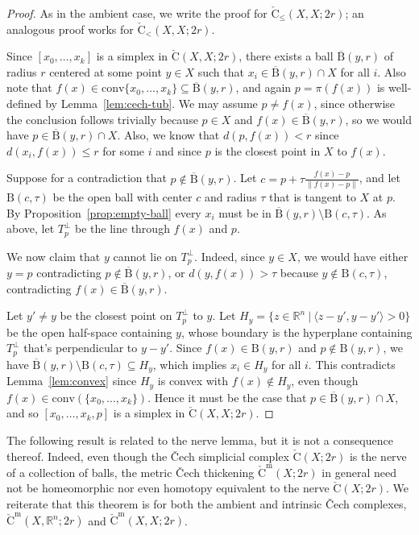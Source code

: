 \documentclass{amsart}
\theoremstyle{plain}
\theoremstyle{definition}
\theoremstyle{myremark}
\newcommand{\R}{\mathbb{R}}
\newcommand{\conv}{\mathrm{conv}}
\newcommand{\ball}[2]{\mathrm{B}(#1,#2)}
\newcommand{\cball}[2]{\overline{\mathrm{B}}(#1,#2)}
\newcommand{\cech}[2]{\mathrm{\check{C}}(#1;#2)}
\newcommand{\cecha}[3]{\mathrm{\check{C}}(#1,#2;#3)}
\newcommand{\cechaleq}[3]{\mathrm{\check{C}_{\le}}(#1,#2;#3)}
\newcommand{\cechaless}[3]{\mathrm{\check{C}_{<}}(#1,#2;#3)}
\newcommand{\cechm}[2]{\mathrm{\check{C}^m}(#1;#2)}
\newcommand{\cecham}[3]{\mathrm{\check{C}^m}(#1,#2;#3)}
\begin{document}
\begin{proof}
As in the ambient case, we write the proof for $\cechaleq{X}{X}{2r}$; an analogous proof works for $\cechaless{X}{X}{2r}$.

Since $[x_0 , \ldots , x_k]$ is a simplex in $\cecha{X}{X}{2r}$, there exists a ball $\cball{y}{r}$ of radius $r$ centered at some point $y\in X$ such that $x_i \in \cball{y}{r} \cap X$ for all $i$.
Also note that $f(x) \in \conv\{x_0,\ldots,x_k\}\subseteq \cball{y}{r}$, and again $p=\pi(f(x))$ is well-defined by Lemma~\ref{lem:cech-tub}.
We may assume $p\neq f(x)$, since otherwise the conclusion follows trivially because $p \in X$ and $f(x)\in \cball{y}{r}$, so we would have $p \in \cball{y}{r} \cap X$.
Also, we know that $d(p,f(x)) < r$ since $d(x_i,f(x)) \le r$ for some $i$ and since $p$ is the closest point in $X$ to $f(x)$.

Suppose for a contradiction that $p \notin \cball{y}{r}$.
Let $c=p+\tau\frac{f(x)-p}{\|f(x)-p\|}$, and let $\ball{c}{\tau}$ be the open ball with center $c$ and radius $\tau$ that is tangent to $X$ at $p$.
By Proposition~\ref{prop:empty-ball} every $x_i$ must be in $\cball{y}{r} \setminus \ball{c}{\tau}$.
As above, let $T_p^{\perp}$ be the line through $f(x)$ and $p$.

We now claim that $y$ cannot lie on $T_p^{\perp}$.
Indeed, since $y \in X$, we would have either $y = p$ contradicting $p \notin \cball{y}{r}$, or $d(y,f(x)) > \tau$ because $y \notin \ball{c}{\tau}$, contradicting $f(x) \in \cball{y}{r}$.

Let $y'\neq y$ be the closest point on $T_p^\perp$ to $y$.
Let $H_y=\{z\in\R^n~|~\langle z-y',y-y'\rangle>0\}$ be the open half-space containing $y$, whose boundary is the hyperplane containing $T_p^\perp$ that's perpendicular to $y-y'$.
Since $f(x)\in\ball{y}{r}$ and $p\notin\ball{y}{r}$, we have $\cball{y}{r} \setminus \ball{c}{\tau} \subseteq H_y$, which implies $x_i \in H_y$ for all $i$.
This contradicts Lemma~\ref{lem:convex} since $H_y$ is convex with $f(x)\notin H_y$, even though $f(x)\in\conv(\{x_0,\ldots,x_k\})$.
Hence it must be the case that $p \in \cball{y}{r} \cap {X}$, and so $[x_0 , \ldots , x_k , p ]$ is a simplex in $\cecha{X}{X}{2r}$.
\end{proof}

The following result is related to the nerve lemma, but it is not a consequence thereof. Indeed, even though the \v{C}ech simplicial complex $\cech{X}{2r}$ is the nerve of a collection of balls, the metric \v{C}ech thickening $\cechm{X}{2r}$ in general need not be homeomorphic nor even homotopy equivalent to the nerve $\cech{X}{2r}$. We reiterate that this theorem is for both the ambient and intrinsic \v{C}ech complexes, $\cecham{X}{\R^n}{2r}$ and $\cecham{X}{X}{2r}$.
\end{document}

